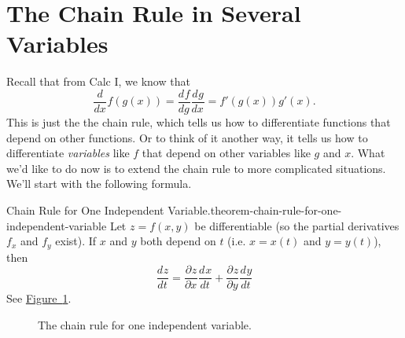 \documentclass[10pt,]{book}
\numberwithin{equation}{section}
\newcommand{\dv}[3][]{\dfrac{d^{#1} #2}{d #3^{#1}}}
\newcommand{\pdv}[3][]{\dfrac{\partial^{#1} #2}{\partial #3^{#1}}}
\begin{document}
\section[{The Chain Rule in Several Variables}]{The Chain Rule in Several Variables}\label{section-the-chain-rule-in-several-variables}
\hypertarget{p-1384}{}%
Recall that from Calc I, we know that%
\begin{equation*}
\dv{}{x}f(g(x)) = \dv{f}{g}\dv{g}{x} = f'(g(x))g'(x).
\end{equation*}
This is just the the chain rule, which tells us how to differentiate functions that depend on other functions. Or to think of it another way, it tells us how to differentiate \emph{variables} like \(f\) that depend on other variables like \(g\) and \(x\). What we'd like to do now is to extend the chain rule to more complicated situations. We'll start with the following formula.%
\begin{theorem}{Chain Rule for One Independent Variable.}{}{theorem-chain-rule-for-one-independent-variable}%
\hypertarget{p-1385}{}%
Let \(z = f(x,y)\) be differentiable (so the partial derivatives \(f_{x}\) and \(f_{y}\) exist). If \(x\) and \(y\) both depend on \(t\) (i.e. \(x = x(t)\) and \(y = y(t)\)), then%
\begin{equation*}
\dv{z}{t} = \pdv{z}{x}\dv{x}{t} + \pdv{z}{y}\dv{y}{t}
\end{equation*}
See \hyperref[figure-chain-rule-one-independent-variable]{Figure~\ref{figure-chain-rule-one-independent-variable}}.%
\end{theorem}
\begin{figure}
\centering
{
}
\caption{The chain rule for one independent variable.\label{figure-chain-rule-one-independent-variable}}
\end{figure}
\end{document}
